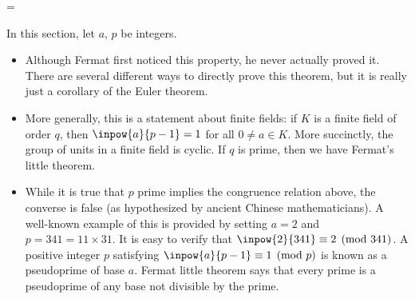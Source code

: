 \documentclass[12pt]{article}
\newcommand{\intpow}[2]{{#1}^{#2}}
\begin{document}
	
\parskip=\baselineskip

\begin{cnl}
		
\bigskip
		
In this section, let $a$, $p$ be integers.		
		
		

\thm{If $p$ is a prime, then $$\intpow{a}{p} \equiv a \pmod{p}$$}



	\begin{remark}
	\begin{itemize}
		\item Although Fermat first noticed this property, he never actually proved it.  There are several different ways to directly prove this theorem, but it is really just a corollary of the Euler theorem.
		\item More generally, this is a statement about finite fields: if $K$ is a finite field of order $q$, then $\inpow{a}{p-1} = 1$ for all $0\ne a\in K$.  More succinctly, the group of units in a finite field is cyclic.  If $q$ is prime, then we have Fermat's little theorem.
		\item While it is true that $p$ prime implies the congruence relation above, the converse is false (as hypothesized by ancient Chinese mathematicians).  A well-known example of this is provided by setting $a=2$ and $p=341=11\times 31$.  It is easy to verify that $\inpow{2}{341}\equiv 2 \pmod{341}$.  A positive integer $p$ satisfying $\inpow{a}{p-1}  \equiv 1 \pmod{p}$ is known as a pseudoprime of base $a$.  Fermat little theorem says that every prime is a pseudoprime of any base not divisible by the prime.
	\end{itemize}
\end{remark}





\end{cnl}
\end{document}
